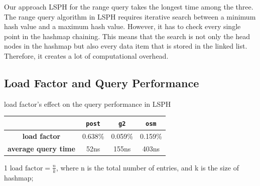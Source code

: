Our approach LSPH for the range query takes the longest time among the three. The range query algorithm in LSPH requires iterative search between a minimum hash value and a maximum hash value. However, it has to check every single point in the hashmap chaining. This means that the search is not only the head nodes in the hashmap but also every data item that is stored in the linked list. Therefore, it creates a lot of computational overhead. 


\subsection{Load Factor and Query Performance}

\begin{center}
\begin{adjustbox}{max width={\textwidth}, max totalheight={\textheight},keepaspectratio}
\begin{threeparttable}
\caption{load factor's effect on the query performance in LSPH}
\begin{tabular}{c|c c c}
    \toprule
                                    &\texttt{post}      & \texttt{g2} & \texttt{osm}             \\ \midrule 
    \textbf{load factor}\tnote{1}            & 0.638\%   & 0.059\%   & 0.159\% \\
    \textbf{average query time}     & 52ns      & 155ns     & 403ns   \\
    \bottomrule
\end{tabular}
\begin{tablenotes}
\item[1] $\text{load factor} = \frac{n}{k}$, where n is the total number of entries, and k is the size of hashmap;
\end{tablenotes}
\end{threeparttable}
\label{table:loadfactor}
\end{adjustbox}
\end{center}

